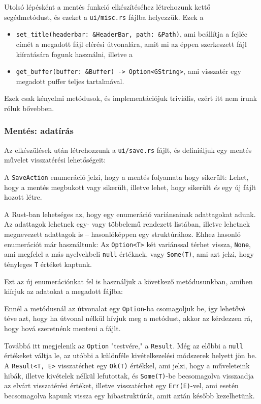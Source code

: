 Utolsó lépésként a mentés funkció elkészítéséhez létrehozunk kettő segédmetódust,
és ezeket a \texttt{ui/misc.rs} fájlba helyezzük.
Ezek a 
\begin{itemize}
    \item \verb+set_title(headerbar: &HeaderBar, path: &Path)+,
    ami beállítja a fejléc címét a megadott fájl elérési útvonalára,
    amit mi az éppen szerkeszett fájl kiíratására fogunk használni, illetve a
    \item \verb+get_buffer(buffer: &Buffer) -> Option<GString>+,
    ami visszatér egy megadott puffer teljes tartalmával.
\end{itemize}
Ezek csak kényelmi metódusok, és implementációjuk triviális, ezért itt nem írunk róluk bővebben.

\subsubsection{Mentés: adatírás}

Az elkészülések után létrehozzunk a \texttt{ui/save.rs} fájlt,
és definiáljuk egy mentés művelet visszatérési lehetőségeit:



A \texttt{SaveAction} enumeráció jelzi, hogy a mentés folyamata hogy sikerült:
Lehet, hogy a mentés megbukott vagy sikerült, illetve lehet, hogy sikerült \textit{és}
egy új fájlt hozott létre.

A Rust-ban lehetséges az, hogy egy enumeráció variánsainak adattagokat adunk.
Az adattagok lehetnek egy- vagy többelemű rendezett listában, illetve lehetnek
megnevezett adattagok is -- hasonlóképpen egy struktúrához.
Ehhez hasonló enumerációt már használtunk: Az \texttt{Option<T>} két variánssal térhet vissza,
\texttt{None}, ami megfelel a más nyelvekbeli \texttt{null} értéknek, vagy
\texttt{Some(T)}, ami azt jelzi, hogy tényleges \texttt{T} értéket kaptunk.

Ezt az új enumerációnkat fel is használjuk a következő metódusunkban, amiben
kiírjuk az adatokat a megadott fájlba:



Ennél a metódusnál az útvonalat egy \texttt{Option}-ba csomagoljuk be, így lehetővé téve
azt, hogy ha útvonal nélkül hívjuk meg a metódust, akkor az kérdezzen rá, hogy hová
szeretnénk menteni a fájlt.

Továbbá itt megjelenik az \texttt{Option} "testvére," a \texttt{Result}.
Még az előbbi a \texttt{null} értékeket váltja le, az utóbbi a különféle kivételkezelési
módszerek helyett jön be.
A \texttt{Result<T, E>} visszatérhet egy \texttt{Ok(T)} értékkel, ami jelzi,
hogy a műveleteink hibák, illetve kivételek nélkül lefutottak, és \texttt{Some(T)}-be 
becsomagolva visszaadja az elvárt visszatérési értéket,
illetve visszatérhet egy \texttt{Err(E)}-vel, ami esetén becsomagolva kapunk vissza
egy hibastruktúrát, amit aztán később kezelhetünk.

